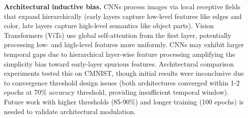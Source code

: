 \textbf{Architectural inductive bias.} CNNs process images via local receptive fields that expand hierarchically (early layers capture low-level features like edges and color, late layers capture high-level semantics like object parts). Vision Transformers (ViTs) use global self-attention from the first layer, potentially processing low- and high-level features more uniformly. CNNs may exhibit larger temporal gaps due to hierarchical layer-wise feature processing amplifying the simplicity bias toward early-layer spurious features. Architectural comparison experiments tested this on CMNIST, though initial results were inconclusive due to convergence threshold design issues (both architectures converged within 1-2 epochs at 70\% accuracy threshold, providing insufficient temporal window). Future work with higher thresholds (85-90\%) and longer training (100 epochs) is needed to validate architectural modulation.
